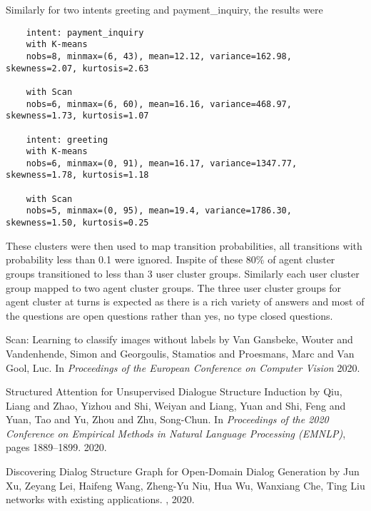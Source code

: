 \documentclass{article}
\begin{document}
Similarly for two intents greeting and payment\_inquiry, the results were

\begin{verbatim}
    intent: payment_inquiry
    with K-means
    nobs=8, minmax=(6, 43), mean=12.12, variance=162.98, skewness=2.07, kurtosis=2.63
    
    with Scan
    nobs=6, minmax=(6, 60), mean=16.16, variance=468.97, skewness=1.73, kurtosis=1.07
    
    intent: greeting 
    with K-means
    nobs=6, minmax=(0, 91), mean=16.17, variance=1347.77, skewness=1.78, kurtosis=1.18
    
    with Scan
    nobs=5, minmax=(0, 95), mean=19.4, variance=1786.30, skewness=1.50, kurtosis=0.25
\end{verbatim}
    
These clusters were then used to map transition probabilities, all transitions with probability less than 0.1 were ignored. Inspite of these 80\% of agent cluster groups transitioned to less than 3 user cluster groups. Similarly each user cluster group mapped to two agent cluster groups. The three user cluster groups for agent cluster at turns is expected as there is a rich variety of answers and most of the questions are open questions rather than yes, no type closed questions.



 
\begin{thebibliography}{1}
    \newblock Scan: Learning to classify images without labels by 
	Van Gansbeke, Wouter and Vandenhende, Simon and Georgoulis, Stamatios and Proesmans, Marc and Van Gool, Luc.
	\newblock In {\em Proceedings of the European Conference on Computer Vision} 2020.
	


	\newblock Structured Attention for Unsupervised Dialogue Structure Induction by
	Qiu, Liang  and Zhao, Yizhou  and Shi, Weiyan  and Liang, Yuan  and      Shi, Feng  and Yuan, Tao  and Yu, Zhou  and Zhu, Song-Chun.
	\newblock In {\em Proceedings of the 2020 Conference on Empirical Methods in Natural Language Processing (EMNLP)}, pages 1889--1899.  2020.

	\newblock Discovering Dialog Structure Graph for Open-Domain Dialog Generation by Jun Xu, Zeyang Lei, Haifeng Wang, Zheng-Yu Niu, Hua Wu, Wanxiang Che, Ting Liu
	networks with existing applications.
	, 2020.

\end{thebibliography}
\end{document}
